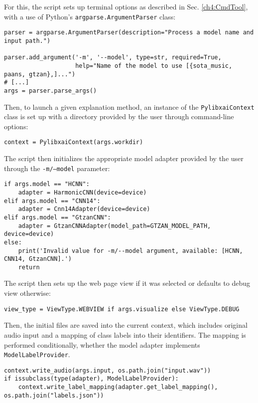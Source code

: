 \documentclass[
    bindingoffset=5mm,  %
    footnoteindent=3mm, %
    hyphenation=true    %
]{src/wut-thesis}
\begin{document}
For this, the script sets up terminal options as described in Sec. \ref{ch4:CmdTool}, with a use of Python's \texttt{argparse.ArgumentParser} class:
\begin{verbatim}
parser = argparse.ArgumentParser(description="Process a model name and input path.")
    
parser.add_argument('-m', '--model', type=str, required=True,
                    help="Name of the model to use [{sota_music, paans, gtzan},]...")
# [...]
args = parser.parse_args()
\end{verbatim}

Then, to launch a given explanation method, an instance of the \texttt{PylibxaiContext} class
is set up with a directory provided by the user through command-line options:

\begin{verbatim}
context = PylibxaiContext(args.workdir)
\end{verbatim}

The script then initializes the appropriate model adapter provided by the user through the \texttt{-m/--model} parameter: 
\begin{verbatim}
if args.model == "HCNN":
    adapter = HarmonicCNN(device=device)
elif args.model == "CNN14":
    adapter = Cnn14Adapter(device=device)
elif args.model == "GtzanCNN":
    adapter = GtzanCNNAdapter(model_path=GTZAN_MODEL_PATH, device=device)
else:
    print('Invalid value for -m/--model argument, available: [HCNN, CNN14, GtzanCNN].')
    return
\end{verbatim}

The script then sets up the web page view if it was selected or defaults to debug view otherwise: 
\begin{verbatim}
view_type = ViewType.WEBVIEW if args.visualize else ViewType.DEBUG
\end{verbatim}

Then, the initial files are saved into the current context, which includes original audio input
and a mapping of class labels into their identifiers. The mapping is performed conditionally,
whether the model adapter implements \texttt{ModelLabelProvider}.

\begin{verbatim}
context.write_audio(args.input, os.path.join("input.wav"))
if issubclass(type(adapter), ModelLabelProvider):
    context.write_label_mapping(adapter.get_label_mapping(), os.path.join("labels.json"))
\end{verbatim}
\end{document}
